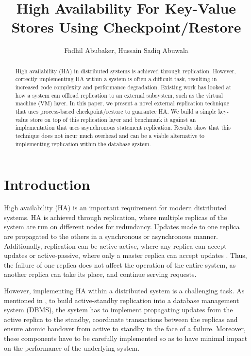 \documentclass[final]{proc}
\title{High Availability For Key-Value Stores Using Checkpoint/Restore}
\author{Fadhil Abubaker, Hussain Sadiq Abuwala}
\date{}
\begin{document}
\maketitle

\begin{abstract}
  High availability (HA) in distributed systems is achieved through replication.
  However, correctly implementing HA within a system is often a difficult task,
  resulting in increased code complexity and performance degradation. Existing
  work has looked at how a system can offload replication to an external
  subsystem, such as the virtual machine (VM) layer. In this paper, we present a
  novel external replication technique that uses process-based
  checkpoint/restore to guarantee HA. We build a simple key-value store on top
  of this replication layer and benchmark it against an implementation that uses
  asynchronous statement replication. Results show that this technique does not
  incur much overhead and can be a viable alternative to implementing
  replication within the database system.
\end{abstract}

\section{Introduction}

High availability (HA) is an important requirement for modern distributed
systems. HA is achieved through replication, where multiple replicas of the
system are run on different nodes for redundancy. Updates made to one replica
are propagated to the others in a synchronous or asynchronous manner.
Additionally, replication can be active-active, where any replica can accept
updates or active-passive, where only a master replica can accept updates
\cite{Dangers}. Thus, the failure of one replica does not affect the operation
of the entire system, as another replica can take its place, and continue
serving requests.

However, implementing HA within a distributed system is a challenging task. As
mentioned in \cite{RemusDB}, to build active-standby replication into a database
management system (DBMS), the system has to implement propagating updates from
the active replica to the standby, coordinate transactions between the replicas
and ensure atomic handover from active to standby in the face of a failure.
Moreover, these components have to be carefully implemented so as to have
minimal impact on the performance of the underlying system.
\end{document}
